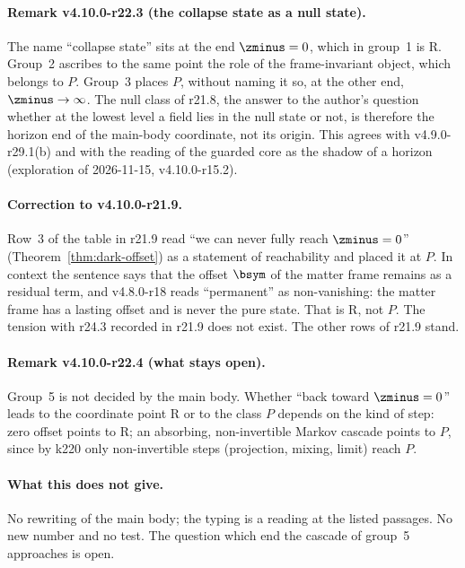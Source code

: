 \paragraph{Remark v4.10.0-r22.3 (the collapse state as a null state).}
The name ``collapse state'' sits at the end \(\zminus=0\), which in group~1 is R.  Group~2 ascribes to the same point the role of the
frame-invariant object, which belongs to \(P\).  Group~3 places \(P\), without naming it so, at the other end, \(\zminus\to\infty\).  The null
class of r21.8, the answer to the author's question whether at the lowest level a field lies in the null state or not, is therefore
the horizon end of the main-body coordinate, not its origin.  This agrees with v4.9.0-r29.1(b) and with the reading of the guarded core
as the shadow of a horizon (exploration of 2026-11-15, v4.10.0-r15.2).

\paragraph{Correction to v4.10.0-r21.9.}
Row~3 of the table in r21.9 read ``we can never fully reach \(\zminus=0\)'' (Theorem~\ref{thm:dark-offset}) as a statement of reachability
and placed it at \(P\).  In context the sentence says that the offset \(\bsym\) of the matter frame remains as a residual term, and
v4.8.0-r18 reads ``permanent'' as non-vanishing: the matter frame has a lasting offset and is never the pure state.  That is R, not
\(P\).  The tension with r24.3 recorded in r21.9 does not exist.  The other rows of r21.9 stand.

\paragraph{Remark v4.10.0-r22.4 (what stays open).}
Group~5 is not decided by the main body.  Whether ``back toward \(\zminus=0\)'' leads to the coordinate point R or to the class \(P\) depends
on the kind of step: zero offset points to R; an absorbing, non-invertible Markov cascade points to \(P\), since by k220 only
non-invertible steps (projection, mixing, limit) reach \(P\).

\paragraph{What this does not give.}
No rewriting of the main body; the typing is a reading at the listed passages.  No new number and no test.  The question which end
the cascade of group~5 approaches is open.

